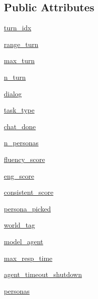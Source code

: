 \subsection*{Public Attributes}
\begin{DoxyCompactItemize}
\item 
\hyperlink{classpersonachat__eval_1_1worlds_1_1PersonaChatEvalWorld_add33bcde1c71e280efa0a77301e4e552}{turn\+\_\+idx}
\item 
\hyperlink{classpersonachat__eval_1_1worlds_1_1PersonaChatEvalWorld_a5207a70758bc6eb4943e27e784f68073}{range\+\_\+turn}
\item 
\hyperlink{classpersonachat__eval_1_1worlds_1_1PersonaChatEvalWorld_ab70b116a8516577ca23c3243d1b54f07}{max\+\_\+turn}
\item 
\hyperlink{classpersonachat__eval_1_1worlds_1_1PersonaChatEvalWorld_a75ab1cfe81b98bb2ddd012d599d73536}{n\+\_\+turn}
\item 
\hyperlink{classpersonachat__eval_1_1worlds_1_1PersonaChatEvalWorld_a8a449c6ca335a73b294776e8a5abf715}{dialog}
\item 
\hyperlink{classpersonachat__eval_1_1worlds_1_1PersonaChatEvalWorld_a6981b7aa030250b3234750df43a80e50}{task\+\_\+type}
\item 
\hyperlink{classpersonachat__eval_1_1worlds_1_1PersonaChatEvalWorld_aa5c8b95b025859d9a4bdb157576832d6}{chat\+\_\+done}
\item 
\hyperlink{classpersonachat__eval_1_1worlds_1_1PersonaChatEvalWorld_a46dd6910dd3d3f4727d879325d14c322}{n\+\_\+personas}
\item 
\hyperlink{classpersonachat__eval_1_1worlds_1_1PersonaChatEvalWorld_a827ffc088d6d929acf1e8ca3ba5f3249}{fluency\+\_\+score}
\item 
\hyperlink{classpersonachat__eval_1_1worlds_1_1PersonaChatEvalWorld_a5efa76866fa27206dc0fa4eaf27090df}{eng\+\_\+score}
\item 
\hyperlink{classpersonachat__eval_1_1worlds_1_1PersonaChatEvalWorld_a4d58a7f5c0e11e42bb1893503c9ed600}{consistent\+\_\+score}
\item 
\hyperlink{classpersonachat__eval_1_1worlds_1_1PersonaChatEvalWorld_acbf918e7115fbd180d8c931d79af46c4}{persona\+\_\+picked}
\item 
\hyperlink{classpersonachat__eval_1_1worlds_1_1PersonaChatEvalWorld_a47e3c2213ce2f77d7aafe62aaf771328}{world\+\_\+tag}
\item 
\hyperlink{classpersonachat__eval_1_1worlds_1_1PersonaChatEvalWorld_a7ff6b62f00f998d07cc3cf45e236a83e}{model\+\_\+agent}
\item 
\hyperlink{classpersonachat__eval_1_1worlds_1_1PersonaChatEvalWorld_af539606fe73799a280c061ed2cdf221b}{max\+\_\+resp\+\_\+time}
\item 
\hyperlink{classpersonachat__eval_1_1worlds_1_1PersonaChatEvalWorld_abec22d8906eed060d0a9f61d414f3902}{agent\+\_\+timeout\+\_\+shutdown}
\item 
\hyperlink{classpersonachat__eval_1_1worlds_1_1PersonaChatEvalWorld_aa73f926de1bb6b60465f658f28e96d98}{personas}
\end{DoxyCompactItemize}


